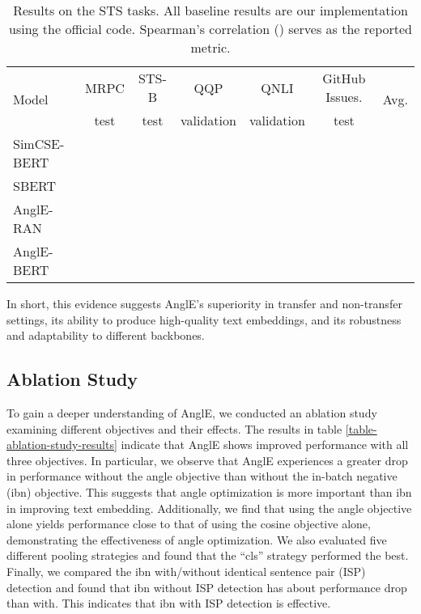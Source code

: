 \documentclass{article} \usepackage{iclr2024_conference,times}
\begin{document}
\begin{table*}[ht]
\small
\centering
\begin{threeparttable}
\begin{tabular}{lcccccc}
\toprule
        \multirow{2}{*}{Model}   & \multicolumn{1}{c}{MRPC} & \multicolumn{1}{c}{STS-B} & 
        \multicolumn{1}{c}{QQP} & \multicolumn{1}{c}{QNLI} & \multicolumn{1}{c}{GitHub Issues.} & \multirow{2}{*}{Avg.}\\

        \cmidrule{2-6}
        &  
          \multicolumn{1}{c}{test} & \multicolumn{1}{c}{test} & 
        \multicolumn{1}{c}{validation} & \multicolumn{1}{c}{validation} &
        \multicolumn{1}{c}{test} \\
\midrule

SimCSE-BERT &  &  &  &  &  &  \\
SBERT &  &  &  &  &  &  \\

\midrule
AnglE-RAN &  &  &  &  &  &  \\
AnglE-BERT &  &  &  &  &  &  \\
\bottomrule
\end{tabular}
\end{threeparttable}
\caption{Results on the STS tasks. All baseline results are our implementation using the official code. Spearman's correlation () serves as the reported metric.} \label{table-supervised-sts-results}
\end{table*}

In short, this evidence suggests AnglE's superiority in transfer and non-transfer settings, its ability to produce high-quality text embeddings, and its robustness and adaptability to different backbones.

\subsection{Ablation Study}
To gain a deeper understanding of AnglE, we conducted an ablation study examining different objectives and their effects. The results in table \ref{table-ablation-study-results} indicate that AnglE shows improved performance with all three objectives. In particular, we observe that AnglE experiences a greater drop in performance without the angle objective than without the in-batch negative (ibn) objective. This suggests that angle optimization is more important than ibn in improving text embedding. Additionally, we find that using the angle objective alone yields performance close to that of using the cosine objective alone, demonstrating the effectiveness of angle optimization. We also evaluated five different pooling strategies and found that the ``cls'' strategy performed the best. Finally, we compared the ibn with/without identical sentence pair (ISP) detection and found that ibn without ISP detection has about  performance drop than with. This indicates that ibn with ISP detection is effective.
\end{document}

